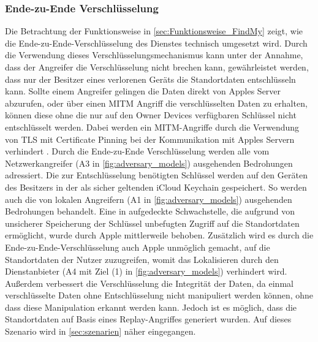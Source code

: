 \subsubsection{Ende-zu-Ende Verschlüsselung}
Die Betrachtung der Funktionsweise in \autoref{sec:Funktionsweise_FindMy} zeigt, wie die Ende-zu-Ende-Verschlüsselung des Dienstes technisch umgesetzt wird.
Durch die Verwendung dieses Verschlüsselungsmechanismus kann unter der Annahme, dass der Angreifer die Verschlüsselung nicht brechen kann, gewährleistet werden, dass nur der Besitzer eines verlorenen Geräts die Standortdaten entschlüsseln kann.
Sollte einem Angreifer gelingen die Daten direkt von Apples Server abzurufen, oder über einen \ac{MITM} Angriff die verschlüsselten Daten zu erhalten, können diese ohne die nur auf den Owner Devices verfügbaren Schlüssel nicht entschlüsselt werden.
Dabei werden ein \ac{MITM}-Angriffe durch die Verwendung von \ac{TLS} mit Certificate Pinning bei der Kommunikation mit Apples Servern verhindert \cite{Heinrich_FindMy}.
Durch die Ende-zu-Ende Verschlüsselung werden alle vom Netzwerkangreifer (A3 in \autoref{fig:adversary_models}) ausgehenden Bedrohungen adressiert.
Die zur Entschlüsselung benötigten Schlüssel werden auf den Geräten des Besitzers in der als sicher geltenden iCloud Keychain gespeichert.
So werden auch die von lokalen Angreifern (A1 in \autoref{fig:adversary_models}) ausgehenden Bedrohungen behandelt.
Eine in \cite{Heinrich_FindMy} aufgedeckte Schwachstelle, die aufgrund von unsicherer Speicherung der Schlüssel unbefugten Zugriff auf die Standortdaten ermöglicht, wurde durch Apple mittlerweile behoben.
Zusätzlich wird es durch die Ende-zu-Ende-Verschlüsselung auch Apple unmöglich gemacht, auf die Standortdaten der Nutzer zuzugreifen, womit das Lokalisieren durch den Dienstanbieter (A4 mit Ziel (1) in \autoref{fig:adversary_models}) verhindert wird.
Außerdem verbessert die Verschlüsselung die Integrität der Daten, da einmal verschlüsselte Daten ohne Entschlüsselung nicht manipuliert werden können, ohne dass diese Manipulation erkannt werden kann.
Jedoch ist es möglich, dass die Standortdaten auf Basis eines Replay-Angriffes generiert wurden.
Auf dieses Szenario wird in \autoref{sec:szenarien} näher eingegangen.


